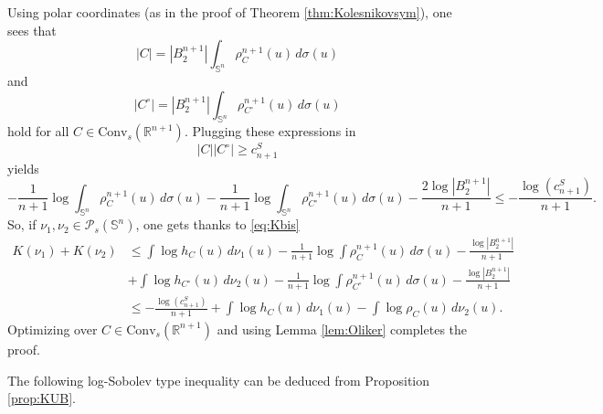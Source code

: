 \documentclass[10pt]{amsart}
\theoremstyle{definition}
\theoremstyle{remark}
\newcommand{\R}{\mathbb{R}}
\newcommand{\Sd}{\mathbb{S}}
\begin{document}
\proof Using polar coordinates (as in the proof of Theorem \ref{thm:Kolesnikovsym}), one sees that
\[
|C| = |B_2^{n+1}|\int_{\Sd^n} \rho_C^{n+1}(u)\,d\sigma(u)
\]
and 
\[
|C^\circ| = |B_2^{n+1}|\int_{\Sd^n} \rho_{C^\circ}^{n+1}(u)\,d\sigma(u)
\]
hold for all $C \in \mathrm{Conv}_s(\R^{n+1})$.
Plugging these expressions in
\[
|C||C^\circ| \geq c_{n+1}^S
\]
yields
\[
-\frac{1}{n+1}\log \int_{\Sd^n} \rho_C^{n+1}(u)\,d\sigma(u) - \frac{1}{n+1}\log \int_{\Sd^n} \rho_{C^\circ}^{n+1}(u)\,d\sigma(u) - \frac{2 \log |B_2^{n+1}|}{n+1}  \leq  - \frac{\log\left(c_{n+1}^S\right)}{n+1}.
\]
So, if $\nu_1,\nu_2 \in \mathcal{P}_s(\Sd^n)$, one gets thanks to \eqref{eq:Kbis}
\begin{align*}
K(\nu_1)+K(\nu_2)& 
\leq\int \log h_C(u)\,d\nu_1(u) - \frac{1}{n+1}\log \int \rho_C^{n+1}(u)\,d\sigma(u) - \frac{\log |B_2^{n+1}|}{n+1}\\
&+ \int \log h_{C^\circ}(u)\,d\nu_2(u) - \frac{1}{n+1}\log \int \rho_{C^\circ}^{n+1}(u)\,d\sigma(u) - \frac{\log |B_2^{n+1}|}{n+1} \\
&\leq - \frac{\log\left(c_{n+1}^S\right)}{n+1}+\int \log h_C(u)\,d\nu_1(u)-\int \log \rho_C(u)\,d\nu_2(u).
\end{align*}
Optimizing over $C \in \mathrm{Conv}_s(\R^{n+1})$ and using Lemma \ref{lem:Oliker} completes the proof.
\endproof

The following log-Sobolev type inequality can be deduced from Proposition \ref{prop:KUB}.
\end{document}
